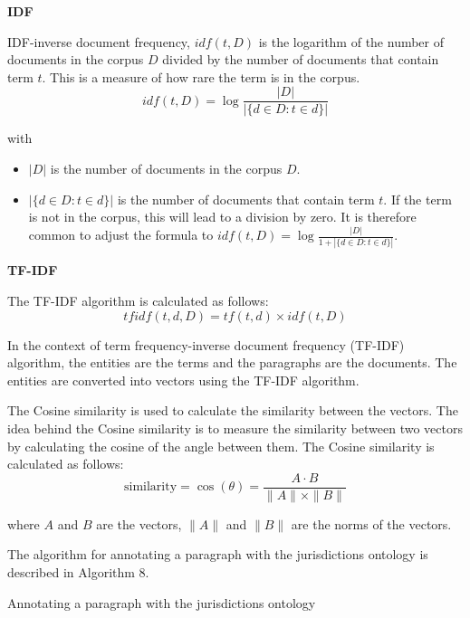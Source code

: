 \begin{algorithm}
\textbf{IDF}

IDF-inverse document frequency, $idf(t, D)$ is the logarithm of the number of documents in the corpus $D$ divided by the number of documents that contain term $t$. This is a measure of how rare the term is in the corpus.
$$
    idf(t, D) = \log \frac{|D|}{|\{d \in D : t \in d\}|}
$$

with
\begin{itemize}
    \item $|D|$ is the number of documents in the corpus $D$.
    \item $|\{d \in D : t \in d\}|$ is the number of documents that contain term $t$. If the term is not in the corpus, this will lead to a division by zero. It is therefore common to adjust the formula to $idf(t, D) = \log \frac{|D|}{1 + |\{d \in D : t \in d\}|}$.
\end{itemize}

\textbf{TF-IDF}

The TF-IDF algorithm is calculated as follows:
$$
    tfidf(t, d, D) = tf(t, d) \times idf(t, D)
$$

In the context of term frequency-inverse document frequency (TF-IDF) algorithm, the entities are the terms and the paragraphs are the documents. The entities are converted into vectors using the TF-IDF algorithm.

The Cosine similarity is used to calculate the similarity between the vectors. The idea behind the Cosine similarity is to measure the similarity between two vectors by calculating the cosine of the angle between them. The Cosine similarity is calculated as follows:
$$
    \text{similarity} = \cos(\theta) = \frac{A \cdot B}{\|A\| \times \|B\|}
$$

where $A$ and $B$ are the vectors, $\|A\|$ and $\|B\|$ are the norms of the vectors.

The algorithm for annotating a paragraph with the jurisdictions ontology is described in Algorithm 8.

\begin{algorithm}
    \caption{Annotating a paragraph with the jurisdictions ontology}
\end{algorithm}


\end{algorithm}

